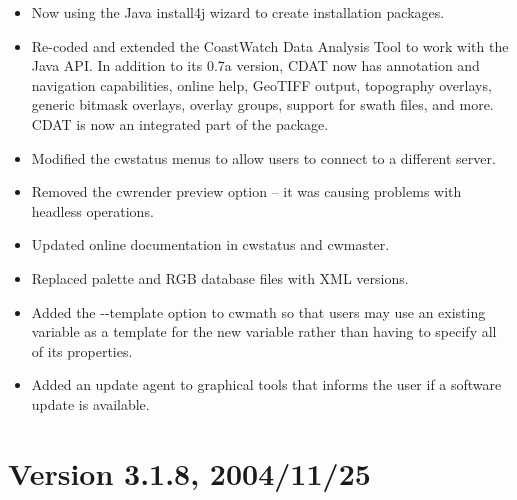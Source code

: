 \begin{itemize}
  \item Now using the Java install4j wizard to create
  installation packages.

  \item Re-coded and extended the CoastWatch Data Analysis Tool to
  work with the Java API. In addition to its 0.7a version, CDAT now
  has annotation and navigation capabilities, online help, GeoTIFF
  output, topography overlays, generic bitmask overlays, overlay
  groups, support for swath files, and more. CDAT is now an integrated
  part of the package.

  \item Modified the cwstatus menus to allow users to connect to a
  different server.

  \item Removed the cwrender preview option -- it was causing problems
  with headless operations.

  \item Updated online documentation in cwstatus and cwmaster.

  \item Replaced palette and RGB database files with XML versions.

  \item Added the -{-}template option to cwmath so that users may use an
  existing variable as a template for the new variable rather than
  having to specify all of its properties.

  \item Added an update agent to graphical tools that informs the user
  if a software update is available.

\end{itemize}




\section*{Version 3.1.8, 2004/11/25}

